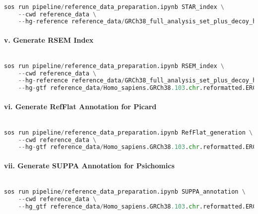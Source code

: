 \documentclass[12pt]{article}
\begin{document}
\noindent
\begin{lstlisting}[language=Python]

sos run pipeline/reference_data_preparation.ipynb STAR_index \
    --cwd reference_data \
    --hg-reference reference_data/GRCh38_full_analysis_set_plus_decoy_hla.noALT_noHLA_noDecoy_ERCC.fasta

\end{lstlisting}




\paragraph*{v. Generate RSEM Index}


\noindent
\begin{lstlisting}[language=Python]

sos run pipeline/reference_data_preparation.ipynb RSEM_index \
    --cwd reference_data \
    --hg-reference reference_data/GRCh38_full_analysis_set_plus_decoy_hla.noALT_noHLA_noDecoy_ERCC.fasta \
    --hg-gtf reference_data/Homo_sapiens.GRCh38.103.chr.reformatted.ERCC.gtf

\end{lstlisting}




\paragraph*{vi. Generate RefFlat Annotation for Picard}


\noindent
\begin{lstlisting}[language=Python]

sos run pipeline/reference_data_preparation.ipynb RefFlat_generation \
    --cwd reference_data \
    --hg-gtf reference_data/Homo_sapiens.GRCh38.103.chr.reformatted.ERCC.gtf

\end{lstlisting}




\paragraph*{vii. Generate SUPPA Annotation for Psichomics}


\noindent
\begin{lstlisting}[language=Python]

sos run pipeline/reference_data_preparation.ipynb SUPPA_annotation \
    --cwd reference_data \
    --hg_gtf reference_data/Homo_sapiens.GRCh38.103.chr.reformatted.ERCC.gtf

\end{lstlisting}
\end{document}
